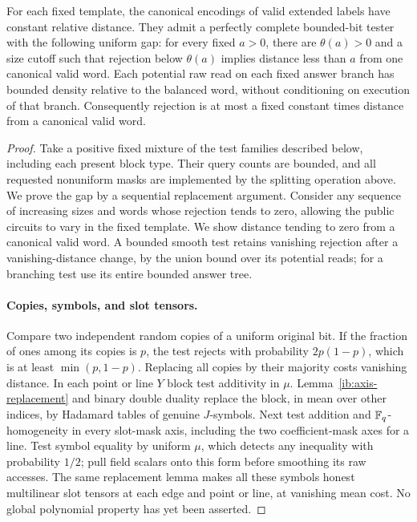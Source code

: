 \begin{proposition}
\label{ib:tester}
For each fixed template, the canonical encodings of valid extended
labels have constant relative distance.  They admit a perfectly
complete bounded-bit tester with the following uniform gap: for every
fixed \(a>0\), there are \(\theta(a)>0\) and a size cutoff such that
rejection below \(\theta(a)\) implies distance less than \(a\) from
one canonical valid word.  Each potential raw read on each fixed
answer branch has bounded density relative to the balanced word,
without conditioning on execution of that branch.  Consequently
rejection is at most a fixed constant times distance from a canonical
valid word.
\end{proposition}

\begin{proof}
Take a positive fixed mixture of the test families described below,
including each present block type.  Their query counts are bounded,
and all requested nonuniform masks are implemented by the splitting
operation above.  We prove the gap by a sequential replacement
argument.  Consider any sequence of increasing sizes and words whose
rejection tends to zero, allowing the public circuits to vary in the
fixed template.  We show distance tending to zero from a canonical
valid word.  A bounded smooth test retains vanishing rejection after
a vanishing-distance change, by the union bound over its potential
reads; for a branching test use its entire bounded answer tree.

\paragraph{Copies, symbols, and slot tensors.}
Compare two independent random copies of a uniform original bit.
If the fraction of ones among its copies is \(p\), the test rejects
with probability \(2p(1-p)\), which is at least
\(\min(p,1-p)\).  Replacing all copies by their majority costs
vanishing distance.  In each point or line \(Y\) block test
additivity in \(\mu\).  Lemma~\ref{ib:axis-replacement} and binary
double duality replace the block, in mean over other indices, by
Hadamard tables of genuine \(J\)-symbols.  Next test addition and
\(\mathbb{F}_q\)-homogeneity in every slot-mask axis, including the two
coefficient-mask axes for a line.  Test symbol equality by uniform
\(\mu\), which detects any inequality with probability \(1/2\);
pull field scalars onto this form before smoothing its raw accesses.
The same replacement lemma makes all these symbols honest
multilinear slot tensors at each edge and point or line, at vanishing
mean cost.  No global polynomial property has yet been asserted.


\end{proof}
